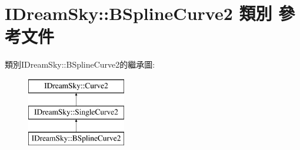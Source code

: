 \hypertarget{class_i_dream_sky_1_1_b_spline_curve2}{}\section{I\+Dream\+Sky\+:\+:B\+Spline\+Curve2 類別 參考文件}
\label{class_i_dream_sky_1_1_b_spline_curve2}
類別\+I\+Dream\+Sky\+:\+:B\+Spline\+Curve2的繼承圖\+:\begin{figure}[H]
\begin{center}
\leavevmode
\includegraphics[height=3.000000cm]{class_i_dream_sky_1_1_b_spline_curve2}
\end{center}
\end{figure}
